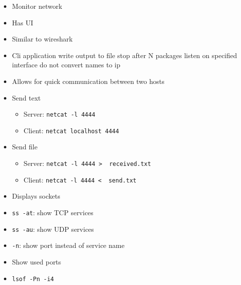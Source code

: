 \begin{itemize}
        \begin{itemize}
            \item Monitor network
            \item Has UI
        \end{itemize}
        \begin{itemize}
            \item Similar to wireshark
            \item Cli application
             write output to file
             stop after N packages
             listen on specified interface
             do not convert names to ip
        \end{itemize}
        \begin{itemize}
            \item Allows for quick communication between two hosts
            \item Send text
                \begin{itemize}
                    \item Server: \verb+netcat -l 4444+
                    \item Client: \verb+netcat localhost 4444+
                \end{itemize}
            \item Send file
                \begin{itemize}
                    \item Server: \verb+netcat -l 4444 >  received.txt+
                    \item Client: \verb+netcat -l 4444 <  send.txt+
                \end{itemize}
        \end{itemize}
        \begin{itemize}
            \item Displays sockets
            \item \verb+ss -at+: show TCP services
            \item \verb+ss -au+: show UDP services
            \item \verb+-n+: show port instead of service name
        \end{itemize}
        \begin{itemize}
            \item Show used ports
            \item \verb+lsof -Pn -i4+
        \end{itemize}
\end{itemize}

